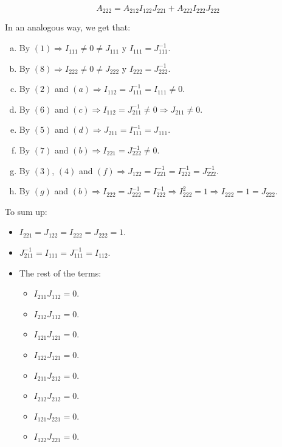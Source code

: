 \begin{equation}
A_{222} = A_{212} I_{122} J_{221} + A_{222} I_{222} J_{222}
\end{equation}

In an analogous way, we get that:

\begin{enumerate}[(a)]
	\item By $(1) \Rightarrow I_{111} \neq 0 \neq J_{111}$ y $I_{111} = J_{111}^{-1}$.
	\item By $(8) \Rightarrow I_{222} \neq 0 \neq J_{222}$ y $I_{222} = J_{222}^{-1}$.
	\item By $(2)$ and $(a) \Rightarrow I_{112} = J_{111}^{-1} = I_{111} \neq 0$.
	\item By $(6)$ and $(c) \Rightarrow I_{112} = J_{211}^{-1} \neq 0 \Rightarrow J_{211} \neq 0$.
	\item By $(5)$ and $(d) \Rightarrow J_{211} = I_{111}^{-1} = J_{111}$.
	\item By $(7)$ and $(b) \Rightarrow I_{221} = J_{222}^{-1} \neq 0$.
	\item By $(3)$, $(4)$ and $(f) \Rightarrow J_{122} = I_{221}^{-1} = I_{222}^{-1} = J_{222}^{-1}$.
	\item By $(g)$ and $(b) \Rightarrow I_{222} = J_{222}^{-1} = I_{222}^{-1} \Rightarrow I_{222}^2 = 1 \Rightarrow I_{222} = 1 = J_{222}$.
\end{enumerate}

\newpage

To sum up:

\begin{itemize}
	\item $I_{221} = J_{122} = I_{222} = J_{222} = 1$.
	\item $J_{211}^{-1} = I_{111} = J_{111}^{-1} = I_{112}$.
	\item The rest of the terms:

	\begin{itemize}
		\item $I_{211} J_{112} = 0$.
		\item $I_{212} J_{112} = 0$.
		\item $I_{121} J_{121} = 0$.
		\item $I_{122} J_{121} = 0$.
		\item $I_{211} J_{212} = 0$.
		\item $I_{212} J_{212} = 0$.
		\item $I_{121} J_{221} = 0$.
		\item $I_{122} J_{221} = 0$.
	\end{itemize}
\end{itemize}

